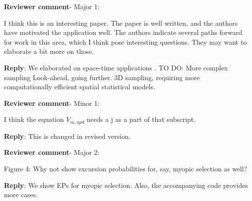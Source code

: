 \documentclass[a4paper]{article}
\def\revcom{\textbf{Reviewer comment}}
\def\reply{\textbf{Reply}}
\begin{document}
\begin{answers}

\item{\revcom - Major 1:}\label{r3c1}

I think this is an interesting paper. The paper is well written, 
and the authors have motivated the application well. 
The authors indicate several paths forward for work in this area, which I think pose interesting questions. They may want to elaborate a bit more on those.

\reply: We elaborated on space-time applications \cite{sigrist2015stochastic,richardson2017sparsity}. TO DO: 
More complex sampling Look-ahead, going further. 3D sampling, requiring more computationally efficient spatial statistical models. 

\item{\revcom - Minor 1:}\label{r3c2}

I think the equation $V_{m,upd}$ needs a j as a part of that subscript.

\reply: This is changed in revised version.

\item{\revcom - Major 2:}\label{r3c3}

Figure 4: Why not show excursion probabilities for, say, myopic selection as well?

\reply: We show EPs for myopic selection. Also, the accompanying code provides more cases.

\end{answers}


\footnotesize



\end{document}
